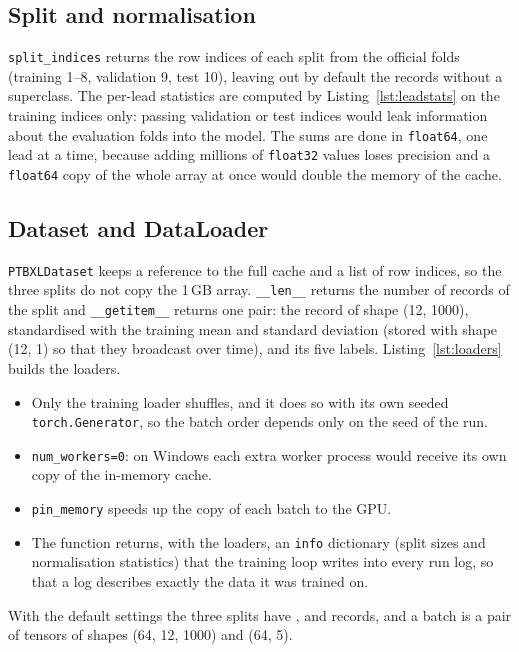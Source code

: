 

\subsection{Split and normalisation}

\texttt{split\_indices} returns the row indices of each split from the official folds (training 1--8,
validation 9, test 10), leaving out by default the records without a superclass. The per-lead statistics
are computed by Listing~\ref{lst:leadstats} on the training indices only: passing validation or test
indices would leak information about the evaluation folds into the model. The sums are done in
\texttt{float64}, one lead at a time, because adding millions of \texttt{float32} values loses precision and a
\texttt{float64} copy of the whole array at once would double the memory of the cache.



\subsection{Dataset and DataLoader}

\texttt{PTBXLDataset} keeps a reference to the full cache and a list of row indices, so the three splits do
not copy the 1\,GB array. \texttt{\_\_len\_\_} returns the number of records of the split and
\texttt{\_\_getitem\_\_} returns one pair: the record of shape (12, 1000), standardised with the training
mean and standard deviation (stored with shape (12, 1) so that they broadcast over time), and its five
labels. Listing~\ref{lst:loaders} builds the loaders.



\begin{itemize}[leftmargin=1.2em,itemsep=1pt]
  \item Only the training loader shuffles, and it does so with its own seeded \texttt{torch.Generator}, so
        the batch order depends only on the seed of the run.
  \item \texttt{num\_workers=0}: on Windows each extra worker process would receive its own copy of the
        in-memory cache.
  \item \texttt{pin\_memory} speeds up the copy of each batch to the GPU.
  \item The function returns, with the loaders, an \texttt{info} dictionary (split sizes and normalisation
        statistics) that the training loop writes into every run log, so that a log describes exactly the
        data it was trained on.
\end{itemize}
With the default settings the three splits have \edaNLabelledTrain{}, \edaNLabelledVal{} and
\edaNLabelledTest{} records, and a batch is a pair of tensors of shapes (64, 12, 1000) and (64, 5).

